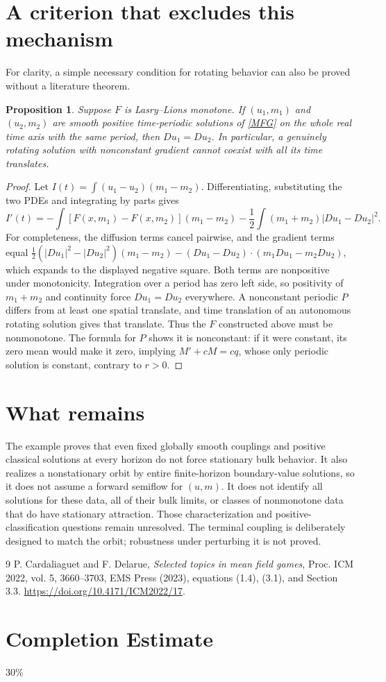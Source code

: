 \documentclass[11pt]{article}
\newtheorem{proposition}[theorem]{Proposition}
\begin{document}
\section{A criterion that excludes this mechanism}
For clarity, a simple necessary condition for rotating behavior can also be proved without a literature theorem.
\begin{proposition}\label{monotone}
Suppose $F$ is Lasry--Lions monotone. If $(u_1,m_1)$ and $(u_2,m_2)$ are smooth positive time-periodic solutions of \eqref{MFG} on the whole real time axis with the same period, then $D u_1=D u_2$. In particular, a genuinely rotating solution with nonconstant gradient cannot coexist with all its time translates.
\end{proposition}
\begin{proof}
Let $I(t)=\int(u_1-u_2)(m_1-m_2)$. Differentiating, substituting the two PDEs and integrating by parts gives
\[
 I'(t)=-\int[F(x,m_1)-F(x,m_2)](m_1-m_2)
       -\frac12\int(m_1+m_2)|Du_1-Du_2|^2.
\]
For completeness, the diffusion terms cancel pairwise, and the gradient terms equal
$\tfrac12(|Du_1|^2-|Du_2|^2)(m_1-m_2)
-(Du_1-Du_2)\cdot(m_1Du_1-m_2Du_2)$,
which expands to the displayed negative square. Both terms are nonpositive under monotonicity. Integration over a period has zero left side, so positivity of $m_1+m_2$ and continuity force $Du_1=Du_2$ everywhere. A nonconstant periodic $P$ differs from at least one spatial translate, and time translation of an autonomous rotating solution gives that translate. Thus the $F$ constructed above must be nonmonotone. The formula for $P$ shows it is nonconstant: if it were constant, its zero mean would make it zero, implying $M'+cM=cq$, whose only periodic solution is constant, contrary to $r>0$.
\end{proof}

\section{What remains}
The example proves that even fixed globally smooth couplings and positive classical solutions at every horizon do not force stationary bulk behavior. It also realizes a nonstationary orbit by entire finite-horizon boundary-value solutions, so it does not assume a forward semiflow for $(u,m)$. It does not identify all solutions for these data, all of their bulk limits, or classes of nonmonotone data that do have stationary attraction. Those characterization and positive-classification questions remain unresolved. The terminal coupling is deliberately designed to match the orbit; robustness under perturbing it is not proved.

\begin{thebibliography}{9}
 P. Cardaliaguet and F. Delarue, \emph{Selected topics in mean field games}, Proc. ICM 2022, vol. 5, 3660--3703, EMS Press (2023), equations (1.4), (3.1), and Section 3.3. \url{https://doi.org/10.4171/ICM2022/17}.
\end{thebibliography}

\section{Completion Estimate}
30\%
\end{document}
